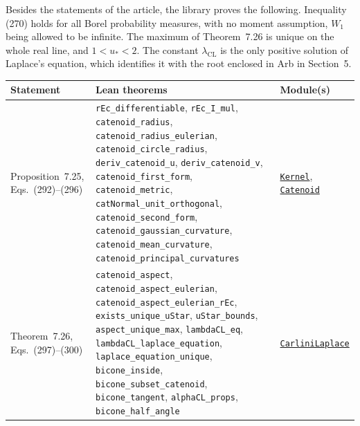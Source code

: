 \documentclass[11pt,a4paper]{article}
\newcommand{\R}{https://github.com/ralfanop/Certifications_Eulerian_polar-curve_computations}
\newcommand{\A}{\R/blob/main/certifications/manuscript15}
\begin{document}
Besides the statements of the article, the library proves the following. Inequality (270) holds for all Borel probability measures, with no moment assumption, $W_1$ being allowed to be infinite. The maximum of Theorem~7.26 is unique on the whole real line, and $1<u_*<2$. The constant $\lambda_{\mathrm{CL}}$ is the only positive solution of Laplace's equation, which identifies it with the root enclosed in Arb in Section~5.
{\small\raggedright
\begin{longtable}{@{}>{\raggedright\arraybackslash}p{}>{\raggedright\arraybackslash}p{}>{\raggedright\arraybackslash}p{}@{}}
\toprule
Statement & Lean theorems & Module(s)\\
\midrule
\endhead
\bottomrule
\endfoot

Proposition~7.25, Eqs.~(292)--(296) & \texttt{rEc\_\allowbreak differentiable}, \texttt{rEc\_\allowbreak I\_\allowbreak mul}, \texttt{catenoid\_\allowbreak radius}, \texttt{catenoid\_\allowbreak radius\_\allowbreak eulerian}, \texttt{catenoid\_\allowbreak circle\_\allowbreak radius}, \texttt{deriv\_\allowbreak catenoid\_\allowbreak u}, \texttt{deriv\_\allowbreak catenoid\_\allowbreak v}, \texttt{catenoid\_\allowbreak first\_\allowbreak form}, \texttt{catenoid\_\allowbreak metric}, \texttt{catNormal\_\allowbreak unit\_\allowbreak orthogonal}, \texttt{catenoid\_\allowbreak second\_\allowbreak form}, \texttt{catenoid\_\allowbreak gaussian\_\allowbreak curvature}, \texttt{catenoid\_\allowbreak mean\_\allowbreak curvature}, \texttt{catenoid\_\allowbreak principal\_\allowbreak curvatures} & \href{\A/LEAN/M15Cert/M15Cert/Kernel.lean}{\texttt{Kernel}}, \href{\A/LEAN/M15Cert/M15Cert/Catenoid.lean}{\texttt{Catenoid}}\\
Theorem~7.26, Eqs.~(297)--(300) & \texttt{catenoid\_\allowbreak aspect}, \texttt{catenoid\_\allowbreak aspect\_\allowbreak eulerian}, \texttt{catenoid\_\allowbreak aspect\_\allowbreak eulerian\_\allowbreak rEc}, \texttt{exists\_\allowbreak unique\_\allowbreak uStar}, \texttt{uStar\_\allowbreak bounds}, \texttt{aspect\_\allowbreak unique\_\allowbreak max}, \texttt{lambdaCL\_\allowbreak eq}, \texttt{lambdaCL\_\allowbreak laplace\_\allowbreak equation}, \texttt{laplace\_\allowbreak equation\_\allowbreak unique}, \texttt{bicone\_\allowbreak inside}, \texttt{bicone\_\allowbreak subset\_\allowbreak catenoid}, \texttt{bicone\_\allowbreak tangent}, \texttt{alphaCL\_\allowbreak props}, \texttt{bicone\_\allowbreak half\_\allowbreak angle} & \href{\A/LEAN/M15Cert/M15Cert/CarliniLaplace.lean}{\texttt{CarliniLaplace}}\\

\end{longtable}}
\end{document}
